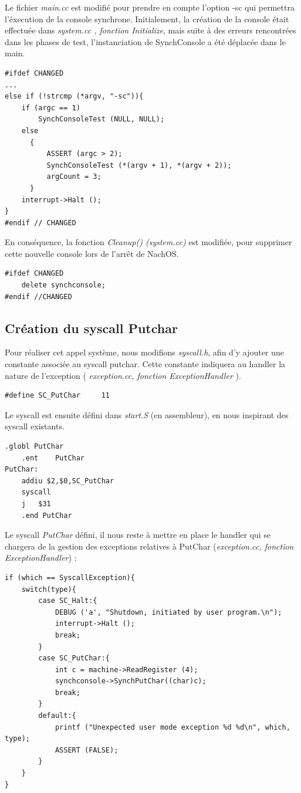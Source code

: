 \documentclass[a4paper,10pt]{article}
\begin{document}
Le fichier \textit{main.cc} est modifié pour prendre en compte l'option -sc qui permettra l'éxecution de la console synchrone.
Initialement, la création de la console était effectuée dans \textit{system.cc , fonction Initialize}, mais suite à des erreurs
rencontrées dans les phases de test, l'instanciation de SynchConsole a été déplacée dans le main.
\begin{lstlisting}[frame=single]
#ifdef CHANGED
...
else if (!strcmp (*argv, "-sc")){
	if (argc == 1)
	    SynchConsoleTest (NULL, NULL);
	else
	  {
	      ASSERT (argc > 2);
	      SynchConsoleTest (*(argv + 1), *(argv + 2));
	      argCount = 3;
	  }
	interrupt->Halt ();
}
#endif // CHANGED
\end{lstlisting}
En conséquence, la fonction \textit{Cleanup() (system.cc)} est modifiée, pour supprimer cette nouvelle console lors de l'arrêt de NachOS.
\begin{lstlisting}[frame=single]
#ifdef CHANGED
    delete synchconsole;
#endif //CHANGED
\end{lstlisting}
\newpage
\subsection{Création du syscall Putchar}
Pour réaliser cet appel système, nous modifions \textit{syscall.h}, afin d'y ajouter une constante associée au syscall putchar.
Cette constante indiquera au handler la nature de l'exception (  \textit{exception.cc, fonction ExceptionHandler} ).
\begin{lstlisting}[frame=single]
 #define SC_PutChar		11
\end{lstlisting}
Le syscall est ensuite défini dans \textit{start.S} (en assembleur), en nous inspirant des syscall existants.

\begin{lstlisting}[frame=single]
	.globl PutChar
	.ent	PutChar
PutChar:
	addiu $2,$0,SC_PutChar
	syscall
	j	$31
	.end PutChar
\end{lstlisting}
Le syscall \textit{PutChar} défini, il nous reste à mettre en place le handler qui se chargera de la gestion
des exceptions relatives à PutChar (\textit{exception.cc, fonction ExceptionHandler}) :

\begin{lstlisting}[frame=single]
if (which == SyscallException){
	switch(type){
		case SC_Halt:{
			DEBUG ('a', "Shutdown, initiated by user program.\n");
			interrupt->Halt ();
			break;
		}
		case SC_PutChar:{
			int c = machine->ReadRegister (4);
			synchconsole->SynchPutChar((char)c);
			break;
		}
		default:{
			printf ("Unexpected user mode exception %d %d\n", which, type);
			ASSERT (FALSE);
		}
	}
}
\end{lstlisting}
\newpage
\end{document}
